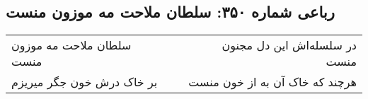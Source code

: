 \begin{center}
\section*{رباعی شماره ۳۵۰: سلطان ملاحت مه موزون منست}
\label{sec:0350}
\begin{longtable}{l p{0.5cm} r}
سلطان ملاحت مه موزون منست
&&
در سلسله‌اش این دل مجنون منست
\\
بر خاک درش خون جگر میریزم
&&
هرچند که خاک آن به از خون منست
\\
\end{longtable}
\end{center}
